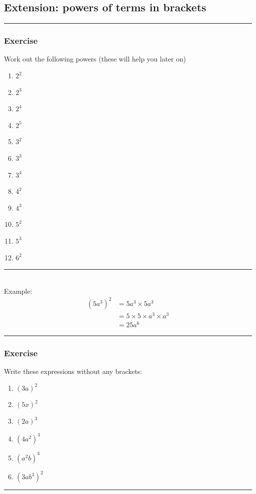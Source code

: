 \documentclass[a4paper,12pt]{article}
\newcommand\question{
	 \rule[0pt]{17cm}{0.5pt}\vspace{-0.5cm}
	\subsubsection{Exercise}

}
\newcommand\questionend{
	\rule[0pt]{17cm}{0.5pt}\vspace{0.0cm}\\
}
\begin{document}
\subsection{Extension: powers of terms in brackets}
\question
Work out the following powers (these will help you later on)
\begin{multicols}{3}
	\begin{enumerate}[label= \normalsize\alph*)~~~]
		\item $2^2$
		\item $2^3$
		\item $2^4$
		\item $2^5$
		\item $3^2$
		\item $3^3$
		\item $3^4$
		\item $4^2$
		\item $4^3$
		\item $5^2$
		\item $5^3$
		\item $6^2$
	\end{enumerate}
\end{multicols}
\questionend
Example:
\begin{align*}
(5a^3)^2 &= 5a^3 \times 5a^3\\
&= 5 \times 5 \times a^3 \times a^3\\
&=25a^6
\end{align*}
\question
Write these expressions without any brackets:
\begin{multicols}{2}
	\begin{enumerate}[label=\normalsize \alph*)~~~]
		\item $(3a)^2$
		\item $(5x)^2$
		\item $(2a)^3$
		\item $(4a^2)^3$
		\item $(a^2b)^3$
		\item $ (3ab^3)^2$
	\end{enumerate}
\end{multicols}
\questionend
\end{document}
